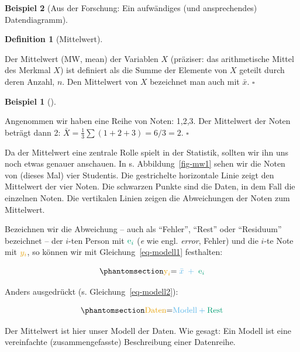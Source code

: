 \documentclass[
  a4paper,
]{scrbook}
\theoremstyle{definition}
\newtheorem{example}{Beispiel}[chapter]
\theoremstyle{definition}
\newtheorem{definition}{Definition}[chapter]
\theoremstyle{definition}
\theoremstyle{remark}
\begin{document}
\begin{example}[Aus der Forschung: Ein aufwändiges (und ansprechendes)
Datendiagramm]
\begin{definition}[Mittelwert]\protect\hypertarget{def-mw}{}\label{def-mw}

Der Mittelwert (MW, mean) der Variablen \(X\) (präziser: das
arithmetische Mittel des Merkmal \(X\)) ist definiert als die Summe der
Elemente von \(X\) geteilt durch deren Anzahl, \(n\). Den Mittelwert von
\(X\) bezeichnet man auch mit \(\bar {x}\). \(\square\)

\end{definition}

\begin{example}[]\protect\hypertarget{exm-mw1}{}\label{exm-mw1}

Angenommen wir haben eine Reihe von Noten: 1,2,3. Der Mittelwert der
Noten beträgt dann 2: \(\bar{X} = \frac{1}{3}\sum (1+2+3) = 6/3 = 2\).
\(\square\)

\end{example}

Da der Mittelwert eine zentrale Rolle spielt in der Statistik, sollten
wir ihn uns noch etwas genauer anschauen. In s. Abbildung~\ref{fig-mw1}
sehen wir die Noten von (dieses Mal) vier Studentis. Die gestrichelte
horizontale Linie zeigt den Mittelwert der vier Noten. Die schwarzen
Punkte sind die Daten, in dem Fall die einzelnen Noten. Die vertikalen
Linien zeigen die Abweichungen der Noten zum Mittelwert.

Bezeichnen wir die Abweichung -- auch als ``Fehler'', ``Rest'' oder
``Residuum'' bezeichnet -- der \(i\)-ten Person mit
\(\color{errorcol}{\text{e}_i}\) (\emph{e} wie engl. \emph{error},
Fehler) und die \(i\)-te Note mit \(\color{ycol}{y_i}\), so können wir
mit Gleichung~\ref{eq-modell1} festhalten:

\begin{equation}\phantomsection\label{eq-modell1}{\color{ycol}{\text{y}_i} \color{black}{ = } \color{modelcol}{\;\bar{x}\;} + \color{errorcol}{\;\text{e}_i}}\end{equation}

Anders ausgedrückt (s. Gleichung~\ref{eq-modell2}):

\begin{equation}\phantomsection\label{eq-modell2}{\color{ycol}{\text{Daten}} \color{black}{ = }     \color{modelcol}{\text{Modell}} + 
\color{errorcol}{\text{Rest}}}\end{equation}

Der Mittelwert ist hier unser Modell der Daten. Wie gesagt: Ein Modell
ist eine vereinfachte (zusammengefasste) Beschreibung einer Datenreihe.


\end{example}
\end{document}
